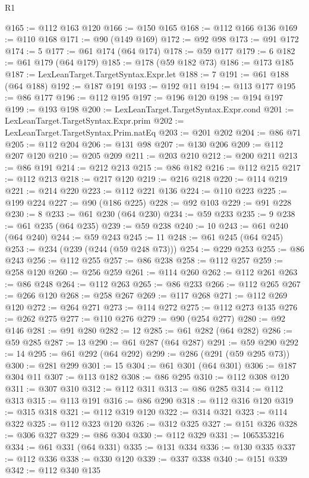 \begin{lexlean}{R1}
\begin{coremodule}
@165 := @112 @163 @120
@166 := @150 @165
@168 := @112 @166 @136
@169 := @110 @168
@171 := @90 (@149 @169)
@172 := @92 @98
@173 := @91 @172
@174 := 5
@177 := @61 @174 (@64 @174)
@178 := @59 @177
@179 := 6
@182 := @61 @179 (@64 @179)
@185 := @178 (@59 @182 @73)
@186 := @173 @185
@187 := LexLeanTarget.TargetSyntax.Expr.let
@188 := 7
@191 := @61 @188 (@64 @188)
@192 := @187 @191
@193 := @192 @11
@194 := @113 @177
@195 := @86 @177
@196 := @112 @195
@197 := @196 @120
@198 := @194 @197
@199 := @193 @198
@200 := LexLeanTarget.TargetSyntax.Expr.cond
@201 := LexLeanTarget.TargetSyntax.Expr.prim
@202 := LexLeanTarget.TargetSyntax.Prim.natEq
@203 := @201 @202
@204 := @86 @71
@205 := @112 @204
@206 := @131 @98
@207 := @130 @206
@209 := @112 @207 @120
@210 := @205 @209
@211 := @203 @210
@212 := @200 @211
@213 := @86 @191
@214 := @212 @213
@215 := @86 @182
@216 := @112 @215
@217 := @112 @213
@218 := @217 @120
@219 := @216 @218
@220 := @114 @219
@221 := @214 @220
@223 := @112 @221 @136
@224 := @110 @223
@225 := @199 @224
@227 := @90 (@186 @225)
@228 := @92 @103
@229 := @91 @228
@230 := 8
@233 := @61 @230 (@64 @230)
@234 := @59 @233
@235 := 9
@238 := @61 @235 (@64 @235)
@239 := @59 @238
@240 := 10
@243 := @61 @240 (@64 @240)
@244 := @59 @243
@245 := 11
@248 := @61 @245 (@64 @245)
@253 := @234 (@239 (@244 (@59 @248 @73)))
@254 := @229 @253
@255 := @86 @243
@256 := @112 @255
@257 := @86 @238
@258 := @112 @257
@259 := @258 @120
@260 := @256 @259
@261 := @114 @260
@262 := @112 @261
@263 := @86 @248
@264 := @112 @263
@265 := @86 @233
@266 := @112 @265
@267 := @266 @120
@268 := @258 @267
@269 := @117 @268
@271 := @112 @269 @120
@272 := @264 @271
@273 := @114 @272
@275 := @112 @273 @135
@276 := @262 @275
@277 := @110 @276
@279 := @90 (@254 @277)
@280 := @92 @146
@281 := @91 @280
@282 := 12
@285 := @61 @282 (@64 @282)
@286 := @59 @285
@287 := 13
@290 := @61 @287 (@64 @287)
@291 := @59 @290
@292 := 14
@295 := @61 @292 (@64 @292)
@299 := @286 (@291 (@59 @295 @73))
@300 := @281 @299
@301 := 15
@304 := @61 @301 (@64 @301)
@306 := @187 @304 @11
@307 := @113 @182
@308 := @86 @295
@310 := @112 @308 @120
@311 := @307 @310
@312 := @112 @311
@313 := @86 @285
@314 := @112 @313
@315 := @113 @191
@316 := @86 @290
@318 := @112 @316 @120
@319 := @315 @318
@321 := @112 @319 @120
@322 := @314 @321
@323 := @114 @322
@325 := @112 @323 @120
@326 := @312 @325
@327 := @151 @326
@328 := @306 @327
@329 := @86 @304
@330 := @112 @329
@331 := 1065353216
@334 := @61 @331 (@64 @331)
@335 := @131 @334
@336 := @130 @335
@337 := @112 @336
@338 := @330 @120
@339 := @337 @338
@340 := @151 @339
@342 := @112 @340 @135

\end{coremodule}
\end{lexlean}
